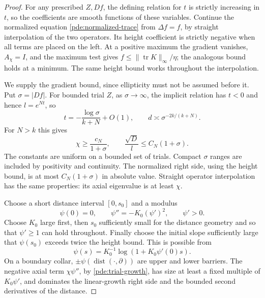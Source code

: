 \begin{proof}
For any prescribed \(Z,Df\), the defining relation for \(t\) is strictly
increasing in \(t\), so the coefficients are smooth functions of these
variables.  Continue the normalized equation
\eqref{pde:normalized-trace} from \(\Delta f=f\), by straight
interpolation of the two operators.  Its height coefficient is strictly
negative when all terms are placed on the left.  At a positive maximum
the gradient vanishes, \(A_\chi=I\), and the maximum test gives
\(f\le\|\operatorname{tr}K\|_\infty/\eta\); the analogous bound holds
at a minimum.  The same height bound works throughout the interpolation.

We supply the gradient bound, since ellipticity must not be assumed
before it.  Put \(\sigma=|Df|\).  For bounded trial \(Z\), as
\(\sigma\to\infty\), the implicit relation has \(t<0\) and hence
\(l=e^{Nt}\), so
\[
 t=-\frac{\log\sigma}{k+N}+O(1),\qquad
 d\asymp\sigma^{-2k/(k+N)}.
\]
For \(N>k\) this gives
\begin{equation}
 \chi\ge\frac{c_N}{1+\sigma},\qquad
 \frac{\sqrt D}{l}\le C_N(1+\sigma).
 \label{pde:trial-growth}
\end{equation}
The constants are uniform on a bounded set of trials.  Compact
\(\sigma\) ranges are included by positivity and continuity.
The normalized right side, using the height bound, is at most
\(C_N(1+\sigma)\) in absolute value.  Straight operator interpolation
has the same properties: its axial eigenvalue is at least \(\chi\).

Choose a short distance interval \([0,s_0]\) and a modulus
\[
 \psi(0)=0,\qquad \psi''=-K_0(\psi')^2,\qquad \psi'>0.
\]
Choose \(K_0\) large first, then \(s_0\) sufficiently small for the
distance geometry and so that \(\psi'\ge1\) can hold throughout.
Finally choose the initial slope sufficiently large that
\(\psi(s_0)\) exceeds twice the height bound.  This is possible from
\[
 \psi(s)=K_0^{-1}\log(1+K_0\psi'(0)s).
\]
On a boundary collar, \(\pm\psi(\operatorname{dist}(\cdot,\partial))\)
are upper and lower barriers.  The negative axial term
\(\chi\psi''\), by \eqref{pde:trial-growth}, has size at least a
fixed multiple of \(K_0\psi'\), and dominates the linear-growth
right side and the bounded second derivatives of the distance.


\end{proof}
